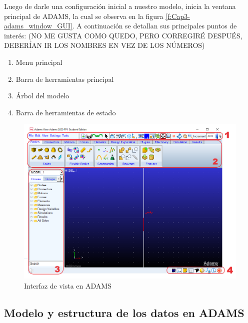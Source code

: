            Luego de darle una configuración inicial a nuestro modelo, inicia la ventana principal de ADAMS, la cual se observa en la figura \eqref{f:Cap3-adams_window_GUI}. A continuación se detallan sus principales puntos de interés: (NO ME GUSTA COMO QUEDO, PERO CORREGIRÉ DESPUÉS, DEBERÍAN IR LOS NOMBRES EN VEZ DE LOS NÚMEROS)
            
            \begin{enumerate}
                \item Menu principal
                \item Barra de herramientas principal
                \item Árbol del modelo
                \item Barra de herramientas de estado
            \end{enumerate}
            
            \begin{figure}[H]
                \centering
                \includegraphics[width=1\linewidth]{Main/Chapter3/Images3/adams/interfaz_vista_adams.png}
                \caption{Interfaz de vista en ADAMS}
                \label{f:Cap3-adams_window_GUI}
            \end{figure} 
            
            
            
            
            
    \subsection{Modelo y estructura de los datos en ADAMS}
        
